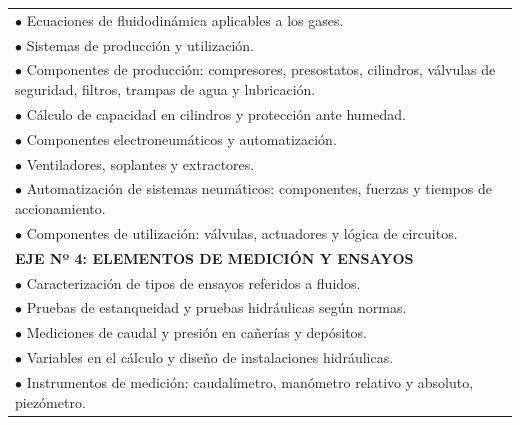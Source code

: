 \documentclass[11pt, a4paper]{article}
\begin{document}
\begin{longtable}{|p{\dimexpr\textwidth-2\tabcolsep-2\arrayrulewidth}|}
$\bullet$ Ecuaciones de fluidodinámica aplicables a los gases. \\
$\bullet$ Sistemas de producción y utilización. \\
$\bullet$ Componentes de producción: compresores, presostatos, cilindros, válvulas de seguridad, filtros, trampas de agua y lubricación. \\
$\bullet$ Cálculo de capacidad en cilindros y protección ante humedad. \\
$\bullet$ Componentes electroneumáticos y automatización. \\
$\bullet$ Ventiladores, soplantes y extractores. \\
$\bullet$ Automatización de sistemas neumáticos: componentes, fuerzas y tiempos de accionamiento. \\
$\bullet$ Componentes de utilización: válvulas, actuadores y lógica de circuitos. \\
\hline
\textbf{EJE Nº 4: ELEMENTOS DE MEDICIÓN Y ENSAYOS} \\
$\bullet$ Caracterización de tipos de ensayos referidos a fluidos. \\
$\bullet$ Pruebas de estanqueidad y pruebas hidráulicas según normas. \\
$\bullet$ Mediciones de caudal y presión en cañerías y depósitos. \\
$\bullet$ Variables en el cálculo y diseño de instalaciones hidráulicas. \\
$\bullet$ Instrumentos de medición: caudalímetro, manómetro relativo y absoluto, piezómetro. \\
\hline
\end{longtable}
\end{document}

